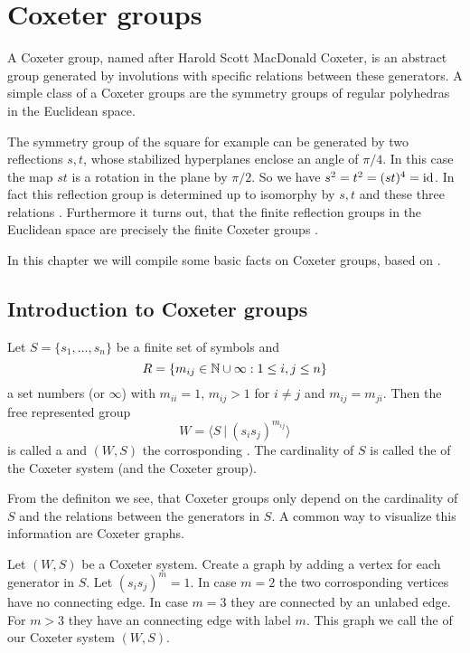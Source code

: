 \section{Coxeter groups}
\label{coxeter-groups}

A Coxeter group, named after Harold Scott MacDonald Coxeter, is an abstract group generated by involutions with specific relations between these generators. A simple class of a Coxeter groups are the symmetry groups of regular polyhedras in the Euclidean space.

The symmetry group of the square for example can be generated by two reflections $s,t$, whose stabilized hyperplanes enclose an angle of $\pi / 4$. In this case the map $st$ is a rotation in the plane by $\pi / 2$. So we have $s^2 = t^2 = (st)^4 = \operatorname{id}$. In fact this reflection group is determined up to isomorphy by $s,t$ and these three relations \cite[Theorem 1.9]{humphreys:coxeter}. Furthermore it turns out, that the finite reflection groups in the Euclidean space are precisely the finite Coxeter groups \cite[Theorem 6.4]{humphreys:coxeter}.

In this chapter we will compile some basic facts on Coxeter groups, based on \cite{humphreys:coxeter}.

\subsection{Introduction to Coxeter groups}

\begin{defi}
	\label{coxeter-system}
	Let $S = \{ s_1, \ldots, s_n \}$ be a finite set of symbols and
	$$R = \{ m_{ij} \in \mathbb{N} \cup \infty : 1 \leq i,j \leq n \}$$
	a set numbers (or $\infty$) with $m_{ii} = 1$, $m_{ij} > 1$ for $i \neq j$ and $m_{ij} = m_{ji}$. Then the free represented group
	$$W = \langle S \ | \ (s_i s_j)^{m_{ij}} \rangle$$
	is called a  and $(W,S)$ the corrosponding . The cardinality of $S$ is called the  of the Coxeter system (and the Coxeter group).
\end{defi}

From the definiton we see, that Coxeter groups only depend on the cardinality of $S$ and the relations between the generators in $S$. A common way to visualize this information are Coxeter graphs.

\begin{defi}
	\label{coxeter-graph}
	Let $(W,S)$ be a Coxeter system. Create a graph by adding a vertex for each generator in $S$. Let $(s_i s_j)^m = 1$. In case $m = 2$ the two corrosponding vertices have no connecting edge. In case $m = 3$ they are connected by an unlabed edge. For $m > 3$ they have an connecting edge with label $m$. This graph we call the  of our Coxeter system $(W,S)$.
\end{defi}

